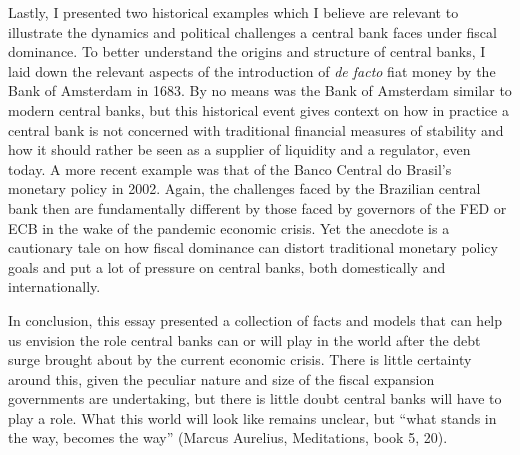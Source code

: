 \documentclass[american]{scrartcl}
\begin{document}
Lastly, I presented two historical examples which I believe are relevant to illustrate the dynamics and political challenges a central bank faces under fiscal dominance. To better understand the origins and structure of central banks, I laid down the relevant aspects of the introduction of \textit{de facto} fiat money by the Bank of Amsterdam in 1683. By no means was the Bank of Amsterdam similar to modern central banks, but this historical event gives context on how in practice a central bank is not concerned with traditional financial measures of stability and how it should rather be seen as a supplier of liquidity and a regulator, even today. A more recent example was that of the Banco Central do Brasil's monetary policy in 2002. Again, the challenges faced by the Brazilian central bank then are fundamentally different by those faced by governors of the FED or ECB in the wake of the pandemic economic crisis. Yet the anecdote is a cautionary tale on how fiscal dominance can distort traditional monetary policy goals and put a lot of pressure on central banks, both domestically and internationally.

In conclusion, this essay presented a collection of facts and models that can help us envision the role central banks can or will play in the world after the debt surge brought about by the current economic crisis. There is little certainty around this, given the peculiar nature and size of the fiscal expansion governments are undertaking, but there is little doubt central banks will have to play a role. What this world will look like remains unclear, but ``what stands in the way, becomes the way'' (Marcus Aurelius, Meditations, book 5, 20).

\newpage
\nocite{Aurelius2002}
\printbibliography
\end{document}
